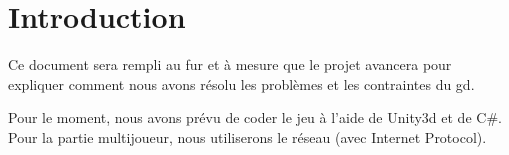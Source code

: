 \part{Introduction}
Ce document sera rempli au fur et à mesure que le projet avancera pour expliquer comment nous avons résolu les problèmes et les contraintes du \acl{gd}.

Pour le moment, nous avons prévu de coder le jeu à l'aide de Unity3d et de C\#.
Pour la partie multijoueur, nous utiliserons le réseau (avec Internet Protocol).


\newpage

\newpage
